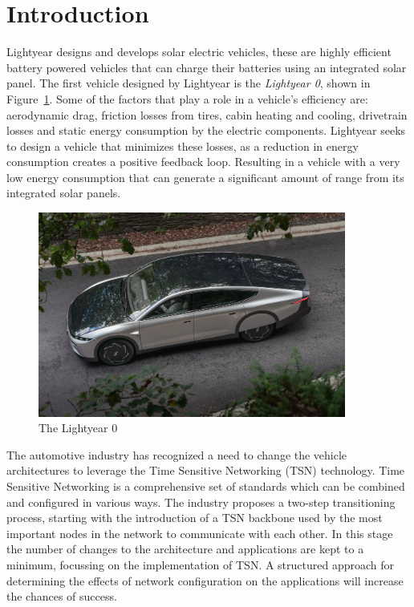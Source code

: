 \section{Introduction}
\label{sec:introduction}
Lightyear designs and develops solar electric vehicles, these are highly efficient battery powered vehicles that can charge their batteries using an integrated solar panel. The first vehicle designed by Lightyear is the \textit{Lightyear 0}, shown in Figure~\ref{fig:zero}. Some of the factors that play a role in a vehicle's efficiency are: aerodynamic drag, friction losses from tires, cabin heating and cooling, drivetrain losses and static energy consumption by the electric components. Lightyear seeks to design a vehicle that minimizes these losses, as a reduction in energy consumption creates a positive feedback loop. Resulting in a vehicle with a very low energy consumption that can generate a significant amount of range from its integrated solar panels.

\begin{figure}[htb]
    \centering
    \includegraphics[width=0.9\textwidth]{images/Lightyear_zero.jpg}
    \caption{The Lightyear 0}
    \label{fig:zero}
\end{figure}

The automotive industry has recognized a need to change the vehicle architectures to leverage the Time Sensitive Networking (TSN) technology. Time Sensitive Networking is a comprehensive set of standards which can be combined and configured in various ways. The industry proposes a two-step transitioning process, starting with the introduction of a TSN backbone used by the most important nodes in the network to communicate with each other. In this stage the number of changes to the architecture and applications are kept to a minimum, focussing on the implementation of TSN. A structured approach for determining the effects of network configuration on the applications will increase the chances of success. 


